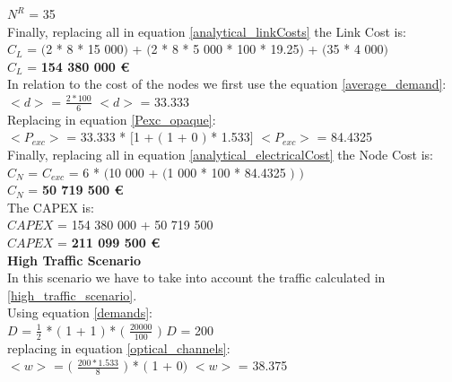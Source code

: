 $N^R$ = 35\\

Finally, replacing all in equation \ref{analytical_linkCosts} the Link Cost is:\\

$C_L$ = $($2 * 8 * 15 000$)$ + $($2 * 8 * 5 000 * 100 * 19.25$)$ + $($35 * 4 000$)$\\

$C_L$ = \textbf{154 380 000 \euro}\\

In relation to the cost of the nodes we first use the equation \ref{average_demand}:\\

$<d>$ = $\frac{2 * 100}{6}$ \qquad \qquad $<d>$ = 33.333\\

Replacing in equation \ref{Pexc_opaque}:\\

$<P_{exc}>$ = 33.333 * $[$1 + $($ 1 + 0 $)$ * 1.533$]$ \qquad \qquad $<P_{exc}>$ = 84.4325 \\

Finally, replacing all in equation \ref{analytical_electricalCost} the Node Cost is:\\

$C_N$ = $C_{exc}$ = 6 * $($10 000 + $($1 000 * 100 * 84.4325 $)$ $)$\\

$C_N$ = \textbf{50 719 500 \euro}\\

The CAPEX is:\\
$CAPEX$ = 154 380 000 + 50 719 500\\

$CAPEX$ = \textbf{211 099 500 \euro}\\

\textbf{High Traffic Scenario}\\
In this scenario we have to take into account the traffic calculated in \ref{high_traffic_scenario}.\\

Using equation \ref{demands}:\\

$D$ = $\frac{1}{2}$ * $($ 1 + 1 $)$ * $($ $\frac{20 000}{100}$ $)$ \qquad \qquad $D$ = 200\\

replacing in equation \ref{optical_channels}:\\

$<w>$ = $($ $\frac{200 * 1.533}{8}$ $)$ * $($ 1 + 0$)$ \qquad \quad $<w>$ = 38.375\\

